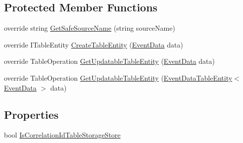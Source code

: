 \subsection*{Protected Member Functions}
\begin{DoxyCompactItemize}
\item 
override string \hyperlink{classCqrs_1_1Azure_1_1BlobStorage_1_1Events_1_1TableStorageEventStore_1_1RawTableStorageEventStore_ab02dd26098d25c2663abdf3da9f57f0f}{Get\+Safe\+Source\+Name} (string source\+Name)
\item 
override I\+Table\+Entity \hyperlink{classCqrs_1_1Azure_1_1BlobStorage_1_1Events_1_1TableStorageEventStore_1_1RawTableStorageEventStore_a916cc6bc33379535690aa0c2e7e90554}{Create\+Table\+Entity} (\hyperlink{classCqrs_1_1Events_1_1EventData}{Event\+Data} data)
\item 
override Table\+Operation \hyperlink{classCqrs_1_1Azure_1_1BlobStorage_1_1Events_1_1TableStorageEventStore_1_1RawTableStorageEventStore_afa1fdd2a115ebf6e12411f8a9e7029a9}{Get\+Updatable\+Table\+Entity} (\hyperlink{classCqrs_1_1Events_1_1EventData}{Event\+Data} data)
\item 
override Table\+Operation \hyperlink{classCqrs_1_1Azure_1_1BlobStorage_1_1Events_1_1TableStorageEventStore_1_1RawTableStorageEventStore_a36cc2b354b0e2dc33a032473e459c8ec}{Get\+Updatable\+Table\+Entity} (\hyperlink{classCqrs_1_1Azure_1_1BlobStorage_1_1EventDataTableEntity}{Event\+Data\+Table\+Entity}$<$ \hyperlink{classCqrs_1_1Events_1_1EventData}{Event\+Data} $>$ data)
\end{DoxyCompactItemize}
\subsection*{Properties}
\begin{DoxyCompactItemize}
\item 
bool \hyperlink{classCqrs_1_1Azure_1_1BlobStorage_1_1Events_1_1TableStorageEventStore_1_1RawTableStorageEventStore_a566f4821980b2ca77f12f88d010beff2}{Is\+Correlation\+Id\+Table\+Storage\+Store}
\end{DoxyCompactItemize}


